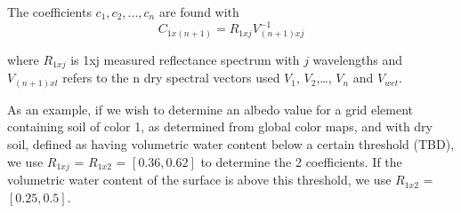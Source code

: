 \documentclass[twoside,10pt]{report}
\begin{document}
\begin{table}[h]
\caption{Dry and saturated soil albedos}
\label{tab:soil_albedo_soil_class}
\end{table}

The coefficients $c_1, c_2,..., c_n$ are found with
\begin{equation}
    C_{1x(n+1)} = {R}_{1xj}V^{-1}_{(n+1)xj}
    \label{eq:GSV_params}
\end{equation}

\noindent where ${R}_{1xj}$ is 1xj measured reflectance spectrum with $j$ wavelengths and $V_{(n+1)xl}$ refers to the n dry spectral vectors used $V_1$, $V_2$,…, $V_n$ and $V_{wet}$. 

As an example, if we wish to determine an albedo value for a grid element containing soil of color 1, as determined from global color maps, and with dry soil, defined as having volumetric water content below a certain threshold (TBD), we use  ${R}_{1xj}$ = ${R}_{1x2}$ = $[0.36, 0.62]$ to determine the 2 coefficients. If the volumetric water content of the surface is above this threshold, we use ${R}_{1x2}$ = $[0.25, 0.5]$.
\end{document}
